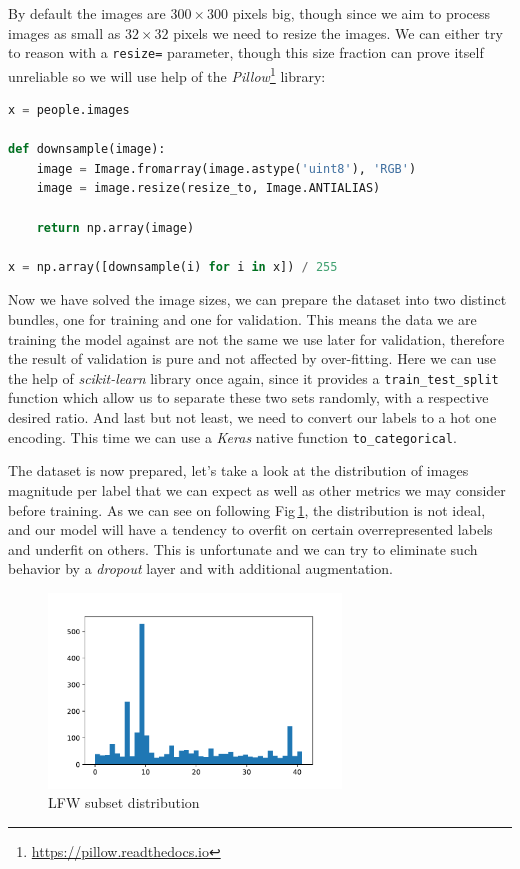 By default the images are $300\times300$ pixels big, though since we aim to process images as small as $32\times32$ pixels we need to resize the images. We can either try to reason with a \texttt{resize=} parameter, though this size fraction can prove itself unreliable so we will use help of the \textit{Pillow}\footnote{\url{https://pillow.readthedocs.io}} library:

\begin{lstlisting}[language=Python, caption=Preprocessing of the dataset]
x = people.images

def downsample(image):
    image = Image.fromarray(image.astype('uint8'), 'RGB')
    image = image.resize(resize_to, Image.ANTIALIAS)

    return np.array(image)

x = np.array([downsample(i) for i in x]) / 255
\end{lstlisting}

Now we have solved the image sizes, we can prepare the dataset into two distinct bundles, one for training and one for validation. This means the data we are training the model against are not the same we use later for validation, therefore the result of validation is pure and not affected by over-fitting. Here we can use the help of \textit{scikit-learn} library once again, since it provides a \texttt{train\_test\_split} function which allow us to separate these two sets randomly, with a respective desired ratio. And last but not least, we need to convert our labels to a hot one encoding. This time we can use a \textit{Keras} native function \texttt{to\_categorical}.

The dataset is now prepared, let's take a look at the distribution of images magnitude per label that we can expect as well as other metrics we may consider before training. As we can see on following Fig\,\ref{fig:lfw_distribution}, the distribution is not ideal, and our model will have a tendency to overfit on certain overrepresented labels and underfit on others. This is unfortunate and we can try to eliminate such behavior by a \textit{dropout} layer and with additional augmentation.

\begin{figure}[ht]
    \centering
    \includegraphics[height=14em]{obrazky-figures/lfw_distribution.pdf}
    \caption{LFW subset distribution}
    \label{fig:lfw_distribution}
\end{figure}

